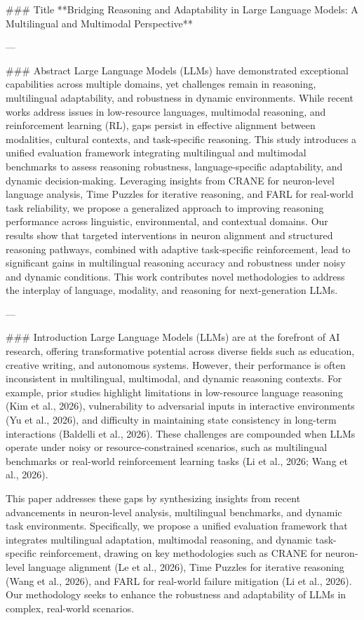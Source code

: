 ### Title
**Bridging Reasoning and Adaptability in Large Language Models: A Multilingual and Multimodal Perspective**

---

### Abstract
Large Language Models (LLMs) have demonstrated exceptional capabilities across multiple domains, yet challenges remain in reasoning, multilingual adaptability, and robustness in dynamic environments. While recent works address issues in low-resource languages, multimodal reasoning, and reinforcement learning (RL), gaps persist in effective alignment between modalities, cultural contexts, and task-specific reasoning. This study introduces a unified evaluation framework integrating multilingual and multimodal benchmarks to assess reasoning robustness, language-specific adaptability, and dynamic decision-making. Leveraging insights from CRANE for neuron-level language analysis, Time Puzzles for iterative reasoning, and FARL for real-world task reliability, we propose a generalized approach to improving reasoning performance across linguistic, environmental, and contextual domains. Our results show that targeted interventions in neuron alignment and structured reasoning pathways, combined with adaptive task-specific reinforcement, lead to significant gains in multilingual reasoning accuracy and robustness under noisy and dynamic conditions. This work contributes novel methodologies to address the interplay of language, modality, and reasoning for next-generation LLMs.

---

### Introduction
Large Language Models (LLMs) are at the forefront of AI research, offering transformative potential across diverse fields such as education, creative writing, and autonomous systems. However, their performance is often inconsistent in multilingual, multimodal, and dynamic reasoning contexts. For example, prior studies highlight limitations in low-resource language reasoning (Kim et al., 2026), vulnerability to adversarial inputs in interactive environments (Yu et al., 2026), and difficulty in maintaining state consistency in long-term interactions (Baldelli et al., 2026). These challenges are compounded when LLMs operate under noisy or resource-constrained scenarios, such as multilingual benchmarks or real-world reinforcement learning tasks (Li et al., 2026; Wang et al., 2026).

This paper addresses these gaps by synthesizing insights from recent advancements in neuron-level analysis, multilingual benchmarks, and dynamic task environments. Specifically, we propose a unified evaluation framework that integrates multilingual adaptation, multimodal reasoning, and dynamic task-specific reinforcement, drawing on key methodologies such as CRANE for neuron-level language alignment (Le et al., 2026), Time Puzzles for iterative reasoning (Wang et al., 2026), and FARL for real-world failure mitigation (Li et al., 2026). Our methodology seeks to enhance the robustness and adaptability of LLMs in complex, real-world scenarios.


